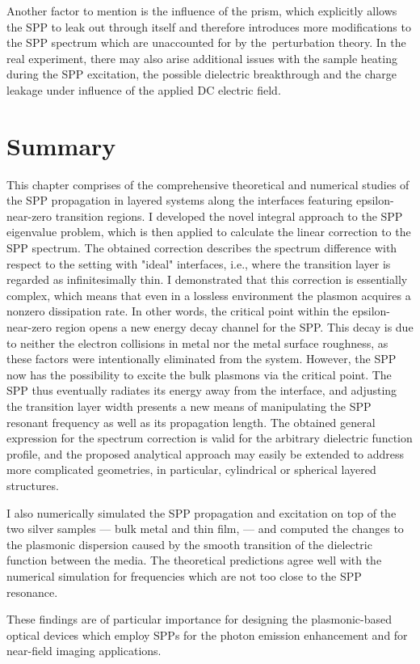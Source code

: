 Another factor to mention is the influence of the prism, which explicitly allows the SPP to leak out through itself and therefore introduces more modifications to the SPP spectrum which are unaccounted for by the~perturbation theory.
In the real experiment, there may also arise additional issues with the sample heating during the SPP excitation, the possible dielectric breakthrough and the charge leakage under influence of the applied DC electric field.

\section{Summary}

This chapter comprises of the comprehensive theoretical and numerical studies of the SPP propagation in layered systems along the interfaces featuring epsilon-near-zero transition regions.
I developed the novel integral approach to the SPP eigenvalue problem, which is then applied to calculate the linear correction to the SPP spectrum.
The obtained correction describes the spectrum difference with respect to the setting with "ideal" interfaces, i.e., where the transition layer is regarded as infinitesimally thin.
I demonstrated that this correction is essentially complex, which means that even in a lossless environment the plasmon acquires a nonzero dissipation rate.
In other words, the critical point within the epsilon-near-zero region opens a new energy decay channel for the SPP.
This decay is due to neither the electron collisions in metal nor the metal surface roughness, as these factors were intentionally eliminated from the system.
However, the SPP now has the possibility to excite the bulk plasmons via the critical point.
The SPP thus eventually radiates its energy away from the interface, and adjusting the transition layer width presents a new means of manipulating the SPP resonant frequency as well as its propagation length.
The obtained general expression for the spectrum correction is valid for the arbitrary dielectric function profile, and the proposed analytical approach may easily be extended to address more complicated geometries, in particular, cylindrical or spherical layered structures.

I also numerically simulated the SPP propagation and excitation on top of the two silver samples --- bulk metal and thin film, ---  and computed the changes to the plasmonic dispersion caused by the smooth transition of the dielectric function between the media.
The theoretical predictions agree well with the numerical simulation for frequencies which are not too close to the SPP resonance.

These findings are of particular importance for designing the plasmonic-based optical devices which employ SPPs for the photon emission enhancement and for near-field imaging applications.

